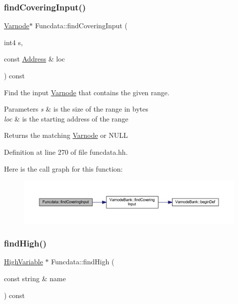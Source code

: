 \subsubsection{\texorpdfstring{findCoveringInput()}{findCoveringInput()}}
{\footnotesize\ttfamily \mbox{\hyperlink{class_varnode}{Varnode}}$\ast$ Funcdata\+::find\+Covering\+Input (\begin{DoxyParamCaption}\item[{int4}]{s,  }\item[{const \mbox{\hyperlink{class_address}{Address}} \&}]{loc }\end{DoxyParamCaption}) const\hspace{0.3cm}{\ttfamily [inline]}}



Find the input \mbox{\hyperlink{class_varnode}{Varnode}} that contains the given range. 


\begin{DoxyParams}{Parameters}
{\em s} & is the size of the range in bytes \\
\hline
{\em loc} & is the starting address of the range \\
\hline
\end{DoxyParams}
\begin{DoxyReturn}{Returns}
the matching \mbox{\hyperlink{class_varnode}{Varnode}} or N\+U\+LL 
\end{DoxyReturn}


Definition at line 270 of file funcdata.\+hh.

Here is the call graph for this function\+:
\nopagebreak
\begin{figure}[H]
\begin{center}
\leavevmode
\includegraphics[width=350pt]{class_funcdata_a6461d0bee74dda24aafa2caa40d0fee7_cgraph}
\end{center}
\end{figure}
\mbox{\label{class_funcdata_aa34c7b2d0d5f4cb28e0a2602d3cba033}} 
\subsubsection{\texorpdfstring{findHigh()}{findHigh()}}
{\footnotesize\ttfamily \mbox{\hyperlink{class_high_variable}{High\+Variable}} $\ast$ Funcdata\+::find\+High (\begin{DoxyParamCaption}\item[{const string \&}]{name }\end{DoxyParamCaption}) const}



